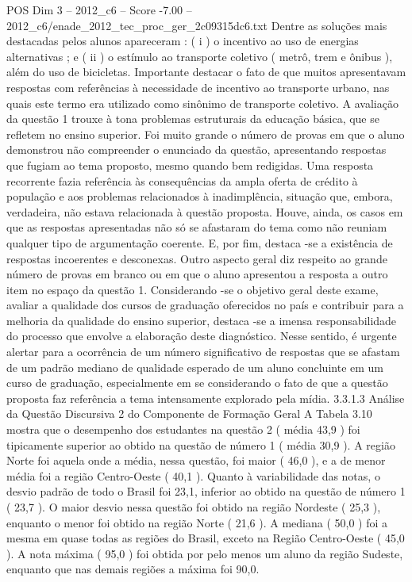 \begin{textsample}{POS Dim 3 – 2012\_c6 – Score -7.00 – 2012\_c6/enade\_2012\_tec\_proc\_ger\_2c09315dc6.txt}
Dentre as soluções mais destacadas pelos alunos apareceram : ( i ) o incentivo ao uso de energias alternativas ; e ( ii ) o estímulo ao transporte coletivo ( metrô, trem e ônibus ), além do uso de bicicletas.
Importante destacar o fato de que muitos apresentavam respostas com referências à necessidade de incentivo ao transporte urbano, nas quais este termo era utilizado como sinônimo de transporte coletivo.
A avaliação da questão 1 trouxe à tona problemas estruturais da educação básica, que se refletem no ensino superior.
Foi muito grande o número de provas em que o aluno demonstrou não compreender o enunciado da questão, apresentando respostas que fugiam ao tema proposto, mesmo quando bem redigidas.
Uma resposta recorrente fazia referência às consequências da ampla oferta de crédito à população e aos problemas relacionados à inadimplência, situação que, embora, verdadeira, não estava relacionada à questão proposta.
Houve, ainda, os casos em que as respostas apresentadas não só se afastaram do tema como não reuniam qualquer tipo de argumentação coerente.
E, por fim, destaca -se a existência de respostas incoerentes e desconexas.
Outro aspecto geral diz respeito ao grande número de provas em branco ou em que o aluno apresentou a resposta a outro item no espaço da questão 1.
Considerando -se o objetivo geral deste exame, avaliar a qualidade dos cursos de graduação oferecidos no país e contribuir para a melhoria da qualidade do ensino superior, destaca -se a imensa responsabilidade do processo que envolve a elaboração deste diagnóstico.
Nesse sentido, é urgente alertar para a ocorrência de um número significativo de respostas que se afastam de um padrão mediano de qualidade esperado de um aluno concluinte em um curso de graduação, especialmente em se considerando o fato de que a questão proposta faz referência a tema intensamente explorado pela mídia. 3.3.1.3 Análise da Questão Discursiva 2 do Componente de Formação Geral A Tabela 3.10 mostra que o desempenho dos estudantes na questão 2 ( média 43,9 ) foi tipicamente superior ao obtido na questão de número 1 ( média 30,9 ).
A região Norte foi aquela onde a média, nessa questão, foi maior ( 46,0 ), e a de menor média foi a região Centro-Oeste ( 40,1 ).
Quanto à variabilidade das notas, o desvio padrão de todo o Brasil foi 23,1, inferior ao obtido na questão de número 1 ( 23,7 ).
O maior desvio nessa questão foi obtido na região Nordeste ( 25,3 ), enquanto o menor foi obtido na região Norte ( 21,6 ).
A mediana ( 50,0 ) foi a mesma em quase todas as regiões do Brasil, exceto na Região Centro-Oeste ( 45,0 ).
A nota máxima ( 95,0 ) foi obtida por pelo menos um aluno da região Sudeste, enquanto que nas demais regiões a máxima foi 90,0.

\end{textsample}
